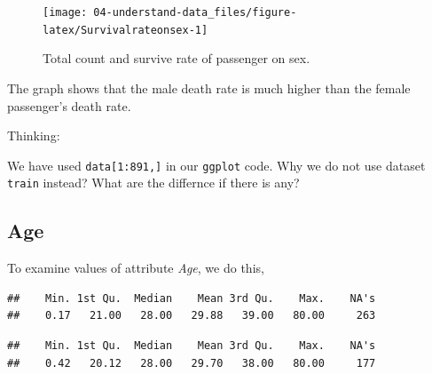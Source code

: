 \documentclass[
]{book}
\newenvironment{Shaded}{\begin{snugshade}}{\end{snugshade}}
\newcommand{\CommentTok}[1]{\textcolor[rgb]{0.56,0.35,0.01}{\textit{#1}}}
\newcommand{\KeywordTok}[1]{\textcolor[rgb]{0.13,0.29,0.53}{\textbf{#1}}}
\newcommand{\NormalTok}[1]{#1}
\newcommand{\OperatorTok}[1]{\textcolor[rgb]{0.81,0.36,0.00}{\textbf{#1}}}
\begin{document}
\begin{figure}

{\centering \texttt{[image: 04-understand-data\_files/figure-latex/Survivalrateonsex-1]} 

}

\caption{Total count and survive rate of passenger on sex.}\label{fig:Survivalrateonsex}
\end{figure}

The graph shows that the male death rate is much higher than the female passenger's death rate.

\begin{rmdthinking}
Thinking:

We have used \texttt{data{[}1:891,{]}} in our \texttt{ggplot} code. Why we do not use dataset \texttt{train} instead? What are the differnce if there is any?
\end{rmdthinking}

\hypertarget{age}{%
\subsection*{Age}\label{age}}


To examine values of attribute \emph{Age}, we do this,

\begin{Shaded}
\end{Shaded}

\begin{verbatim}
##    Min. 1st Qu.  Median    Mean 3rd Qu.    Max.    NA's 
##    0.17   21.00   28.00   29.88   39.00   80.00     263
\end{verbatim}

\begin{Shaded}
\end{Shaded}

\begin{verbatim}
##    Min. 1st Qu.  Median    Mean 3rd Qu.    Max.    NA's 
##    0.42   20.12   28.00   29.70   38.00   80.00     177
\end{verbatim}

\begin{Shaded}
\end{Shaded}
\end{document}
